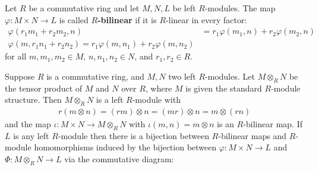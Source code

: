 \documentclass{memoir}
\begin{document}
\begin{defn}
	Let \(R\) be a commutative ring and let \(M,N,L\) be left \(R\)-modules. The map \(\varphi : M \times N \to L\) is called \textbf{\(R\)-bilinear} if it is \(R\)-linear in every factor:
	\begin{align*}
		\varphi (r_1m_1+r_2m_2,n) &= r_1 \varphi (m_1,n) + r_2 \varphi (m_2,n)\\
		\varphi (m,r_1n_1 + r_2n_2) = r_1 \varphi (m,n_1) + r_2 \varphi (m,n_2)
	\end{align*}
	for all \(m, m_1, m_2 \in M\), \(n,n_1,n_2 \in N\), and \(r_1,r_2 \in R\).
\end{defn}

\begin{cor}
	Suppose \(R\) is a commutative ring, and \(M,N\) two left \(R\)-modules. Let \(M \otimes_R N\) be the tensor product of \(M\) and \(N\) over \(R\), where \(M\) is given the standard \(R\)-module structure. Then \(M \otimes_R N\) is a left \(R\)-module with
	\begin{align*}
		r(m \otimes n) = (rm) \otimes n = (mr) \otimes n = m \otimes (rn)
	\end{align*}
	and the map \(\iota:M \times N \to M \otimes_R N\) with \(\iota(m,n) = m \otimes n\) is an \(R\)-bilinear map. If \(L\) is any left \(R\)-module then there is a bijection between \(R\)-bilinear maps and \(R\)-module homomorphisms induced by the bijection between \(\varphi: M\times N \to L \) and \(\Phi: M \otimes_R N \to L \) via the commutative diagram:
\begin{center}
\end{center}
\end{cor}

\begin{exmp}
		
\end{exmp}
\end{document}

